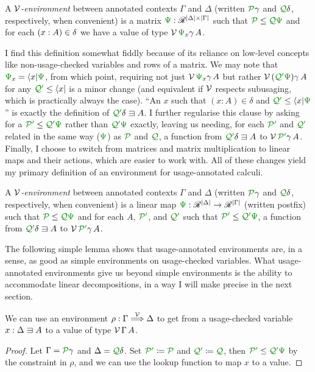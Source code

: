 \begin{definition}
  A \emph{$\mathcal V$-environment} between annotated contexts $\Gamma$ and $\Delta$
  (written $\grP\gamma$ and $\grQ\delta$, respectively, when convenient)
  is a matrix $\gr\Psi : \Ann^{\size\Delta \times \size\Gamma}$ such that
  $\grP \leq \grQ\gr\Psi$ and for each
  $\plr{x : A} \in \delta$ we have a value of type $\V\,\gr\Psi_x\gamma\,A$.
\end{definition}

I find this definition somewhat fiddly because of its reliance on low-level
concepts like non-usage-checked variables and rows of a matrix.
We may note that $\gr\Psi_x = \bra x\gr\Psi$, from which point, requiring not
just $\V\,\gr\Psi_x\gamma\,A$ but rather $\V\,\plr{\grQprime\gr\Psi}\gamma\,A$
for any $\grQprime \leq \bra x$ is a minor change (and equivalent if $\mathcal V$
respects subusaging, which is practically always the case).
``An $x$ such that $(x : A) \in \delta$ and $\grQprime \leq \bra x\gr\Psi$''
is exactly the definition of $\grQprime\delta \sqni A$.
I further regularise this clause by asking for a
$\grPprime \leq \grQprime\gr\Psi$ rather than $\grQprime\gr\Psi$ exactly,
leaving us needing, for each $\grPprime$ and $\grQprime$ related in the same
way ($\gr\Psi$) as $\grP$ and $\grQ$, a function from $\grQprime\delta \sqni A$
to $\V\,\grPprime\gamma\,A$.
Finally, I choose to switch from matrices and matrix multiplication to
linear maps and their actions, which are easier to work with.
All of these changes yield my primary definition of an environment for
usage-annotated calculi.

\begin{definition}\label{def:lr-env}
  A \emph{$\mathcal V$-environment} between annotated contexts $\Gamma$ and $\Delta$
  (written $\grP\gamma$ and $\grQ\delta$, respectively, when convenient)
  is a linear map $\gr\Psi : \Ann^{\size\Delta} \to \Ann^{\size\Gamma}$ (written
  postfix) such that $\grP \leq \grQ\gr\Psi$ and for each $A$, $\grPprime$, and
  $\grQprime$ such that $\grPprime \leq \grQprime\gr\Psi$, a function from
  $\grQprime\delta \sqni A$ to $\V\,\grPprime\gamma\,A$.
\end{definition}

The following simple lemma shows that usage-annotated environments are, in a
sense, as good as simple environments on usage-checked variables.
What usage-annotated environments give us beyond simple environments is the
ability to accommodate linear decompositions, in a way I will make precise in
the next section.

\begin{lemma}
  We can use an environment $\rho : \Gamma \stackrel{\mathcal V}\Longrightarrow \Delta$ to get from a
  usage-checked variable $x : \Delta \sqni A$ to a value of type
  $\mathcal V\,\Gamma\,A$.
\end{lemma}
\begin{proof}
  Let $\Gamma = \grP\gamma$ and $\Delta = \grQ\delta$.
  Set $\grPprime \coloneqq \grP$ and $\grQprime \coloneqq \grQ$, then
  $\grPprime \leq \grQprime\gr\Psi$ by the constraint in $\rho$, and we can
  use the lookup function to map $x$ to a value.
\end{proof}
